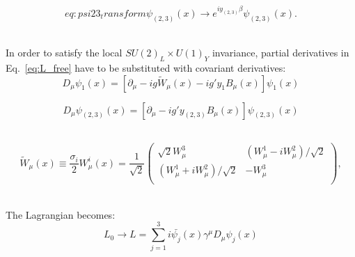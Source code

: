 \begin{equation}{eq:psi23_transform}
\psi_{(2,3)}(x) \rightarrow e^{i y_{(2,3)} \beta} \psi_{(2,3)}(x).
\end{equation}

\\

In order to satisfy the local $SU(2)_L \times U(1)_Y$ invariance, partial derivatives in Eq.~\ref{eq:L_free} have to be substituted with covariant derivatives:\\

\begin{equation}
D_\mu \psi_1(x) = [\partial_\mu - i g {\tilde{W}}_\mu(x) - i g' y_1 B_\mu(x) ] \psi_1(x) 
\end{equation}

\begin{equation}
D_\mu \psi_{(2,3)}(x) = [\partial_\mu - i g' y_{(2,3)} B_\mu(x) ] \psi_{(2,3)}(x) 
\end{equation}

\\ 

\begin{equation}
  {\tilde{W}}_\mu(x) \equiv \frac{\sigma_i}{2} W_\mu^i(x) = \frac{1}{\sqrt{2}} 
  \begin{pmatrix}
  \sqrt{2} W_\mu^3 & (W_\mu^1 - i W_\mu^2)/{\sqrt{2}}\\
  (W_\mu^1 + i W_\mu^2)/{\sqrt{2}} & -W_\mu^3\\
  \end{pmatrix} , 
\end{equation}

\\

The Lagrangian becomes:\\

\begin{equation}\label{eq:L_free_covariant}
L_0 \rightarrow L = \sum_{j=1}^{3} i \bar{\psi_j}(x) \gamma^\mu D_\mu \psi_j(x) 
\end{equation}

